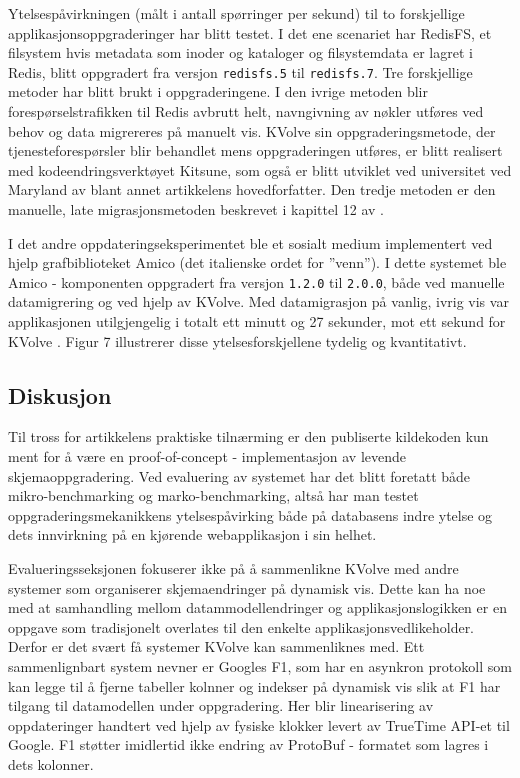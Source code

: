 Ytelsespåvirkningen (målt i antall spørringer per sekund) til to forskjellige applikasjonsoppgraderinger har blitt testet. I det ene scenariet har RedisFS, et filsystem hvis metadata som inoder og kataloger og filsystemdata er lagret i Redis, blitt oppgradert fra versjon \texttt{redisfs.5} til \texttt{redisfs.7}. Tre forskjellige metoder har blitt brukt i oppgraderingene. I den ivrige metoden blir forespørselstrafikken til Redis avbrutt helt, navngivning av nøkler utføres ved behov og data migrereres på manuelt vis. KVolve sin oppgraderingsmetode, der tjenesteforespørsler blir behandlet mens oppgraderingen utføres, er blitt realisert med kodeendringsverktøyet Kitsune, som også er blitt utviklet ved universitet ved Maryland av blant annet artikkelens hovedforfatter. Den tredje metoden er den manuelle, late migrasjonsmetoden beskrevet i kapittel 12 av \cite{sadalage2013}.

I det andre oppdateringseksperimentet ble et sosialt medium implementert ved hjelp grafbiblioteket Amico (det italienske ordet for ''venn''). I dette systemet ble Amico - komponenten oppgradert fra versjon \texttt{1.2.0} til \texttt{2.0.0}, både ved manuelle datamigrering og ved hjelp av KVolve. Med datamigrasjon på vanlig, ivrig vis var applikasjonen utilgjengelig i totalt ett minutt og 27 sekunder, mot ett sekund for KVolve \citep{saur2016}. Figur 7 illustrerer disse ytelsesforskjellene tydelig og kvantitativt.

\subsection{Diskusjon}
Til tross for artikkelens praktiske tilnærming er den publiserte kildekoden kun ment for å være en proof-of-concept - implementasjon av levende skjemaoppgradering. Ved evaluering av systemet har det blitt foretatt både mikro-benchmarking og marko-benchmarking, altså har man testet oppgraderingsmekanikkens ytelsespåvirking både på databasens indre ytelse og dets innvirkning på en kjørende webapplikasjon i sin helhet.

Evalueringsseksjonen fokuserer ikke på å sammenlikne KVolve med andre systemer som organiserer skjemaendringer på dynamisk vis. Dette kan ha noe med at samhandling mellom datammodellendringer og applikasjonslogikken er en oppgave som tradisjonelt overlates til den enkelte applikasjonsvedlikeholder. Derfor er det svært få systemer KVolve kan sammenliknes med. Ett sammenlignbart system \cite{saur2016} nevner er Googles F1, som har en asynkron protokoll som kan legge til å fjerne tabeller kolnner og indekser på dynamisk vis slik at F1 har tilgang til datamodellen under oppgradering. Her blir linearisering av oppdateringer handtert ved hjelp av fysiske klokker levert av TrueTime API-et til Google. F1 støtter imidlertid ikke endring av ProtoBuf - formatet som lagres i dets kolonner.

